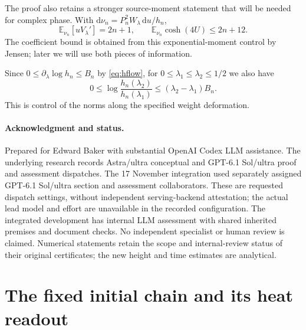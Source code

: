 \documentclass[11pt]{article}
\numberwithin{equation}{section}
\newcommand{\dd}{\mathrm d}
\begin{document}
The proof also retains a stronger source-moment statement that
will be needed for complex phase. With
\(\dd\nu_n=P_n^2W_\lambda\,\dd u/h_n\),
\begin{equation}
 \mathbb E_{\nu_n}[uV_\lambda']=2n+1,\qquad
 \mathbb E_{\nu_n}\cosh(4U)\le2n+12.
 \label{eq:weighted-cosh}
\end{equation}
The coefficient bound is obtained from this exponential-moment
control by Jensen; later we will use both pieces of information.

Since \(0\le\partial_\lambda\log h_n\le B_n\) by \eqref{eq:hflow},
for \(0\le\lambda_1\le\lambda_2\le1/2\) we also have
\[
 0\le\log\frac{h_n(\lambda_2)}{h_n(\lambda_1)}
     \le(\lambda_2-\lambda_1)B_n.
\]
This is control of the norms along the specified weight deformation.

















\paragraph{Acknowledgment and status.}
Prepared for Edward Baker with substantial OpenAI Codex LLM assistance.
The underlying research records Astra/ultra conceptual and
GPT-6.1 Sol/ultra proof and assessment dispatches. The 17 November
integration used separately assigned GPT-6.1 Sol/ultra section and
assessment collaborators. These are requested dispatch settings, without
independent serving-backend attestation; the actual lead model and effort
are unavailable in the recorded configuration. The integrated development
has internal LLM assessment with shared inherited premises and document
checks. No independent specialist or human review is claimed.
Numerical statements retain the scope and internal-review status of their
original certificates; the new height and time estimates are analytical.

\appendix
\section{The fixed initial chain and its heat readout}
\label{sec:fixed-chain}
\end{document}
